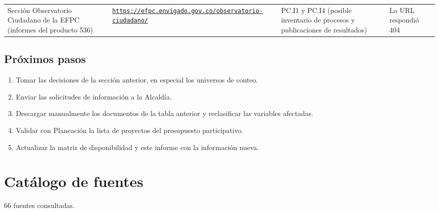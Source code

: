\documentclass[11pt,letterpaper]{article}
\begin{document}
{\begin{xltabular}{\linewidth}{L{3.6cm}YL{3cm}L{3cm}}
Sección Observatorio Ciudadano de la EFPC (informes del producto 536) & \texttt{\footnotesize \href{https://efpc.envigado.gov.co/observatorio-ciudadano/}{https:/\allowbreak{}}\allowbreak{}\href{https://efpc.envigado.gov.co/observatorio-ciudadano/}{/\allowbreak{}}\allowbreak{}\href{https://efpc.envigado.gov.co/observatorio-ciudadano/}{efpc.\allowbreak{}envigado.\allowbreak{}gov.\allowbreak{}co/\allowbreak{}}\allowbreak{}\href{https://efpc.envigado.gov.co/observatorio-ciudadano/}{observatorio-\allowbreak{}ciudadano/\allowbreak{}}} & PC.I1 y PC.I4 (posible inventario de procesos y publicaciones de resultados) & La URL respondió 404 \\
\end{xltabular}
}

\subsection{Próximos pasos}
\begin{enumerate}
\item Tomar las decisiones de la sección anterior, en especial los universos de conteo.
\item Enviar las solicitudes de información a la Alcaldía.
\item Descargar manualmente los documentos de la tabla anterior y reclasificar las variables afectadas.
\item Validar con Planeación la lista de proyectos del presupuesto participativo.
\item Actualizar la matriz de disponibilidad y este informe con la información nueva.
\end{enumerate}

\appendix

\section{Catálogo de fuentes}\label{anexo:fuentes}

66 fuentes consultadas.
\end{document}
